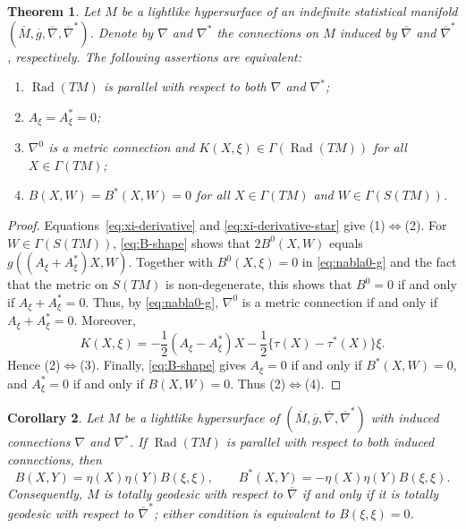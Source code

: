 \documentclass[10pt,a4paper]{amsart}
\newtheorem{theorem}{Theorem}[section]
\newtheorem{corollary}[theorem]{Corollary}
\newcommand{\Rad}{\operatorname{Rad}}
\begin{document}
\begin{theorem}\label{thm:radical-both}
Let $M$ be a lightlike hypersurface of an indefinite statistical manifold
$(\overline{M},\overline{g},\overline{\nabla},\overline{\nabla}^{*})$.
Denote by $\nabla$ and $\nabla^{*}$ the connections on $M$ induced by
$\overline{\nabla}$ and $\overline{\nabla}^{*}$, respectively. The following
assertions are equivalent:
\begin{enumerate}
\item $\Rad(TM)$ is parallel with respect to both $\nabla$ and
$\nabla^{*}$;
\item $A_{\xi}=A_{\xi}^{*}=0$;
\item $\nabla^{0}$ is a metric connection and
$K(X,\xi)\in\Gamma(\Rad(TM))$ for all $X\in\Gamma(TM)$;
\item $B(X,W)=B^{*}(X,W)=0$ for all $X\in\Gamma(TM)$ and
$W\in\Gamma(S(TM))$.
\end{enumerate}
\end{theorem}

\begin{proof}
Equations~\eqref{eq:xi-derivative} and
\eqref{eq:xi-derivative-star} give (1)$\Leftrightarrow$(2). For $W\in\Gamma(S(TM))$, \eqref{eq:B-shape} shows that
$2B^{0}(X,W)$ equals $g((A_{\xi}+A_{\xi}^{*})X,W)$. Together with
$B^{0}(X,\xi)=0$ in \eqref{eq:nabla0-g} and the fact that the metric on
$S(TM)$ is non-degenerate, this shows that $B^{0}=0$ if and only if
$A_{\xi}+A_{\xi}^{*}=0$. Thus, by \eqref{eq:nabla0-g},
$\nabla^{0}$ is a metric connection if and only if
$A_{\xi}+A_{\xi}^{*}=0$. Moreover,
\begin{equation}\label{eq:K-xi}
K(X,\xi)
=-\frac12(A_{\xi}-A_{\xi}^{*})X
-\frac12\{\tau(X)-\tau^{*}(X)\}\xi.
\end{equation}
Hence (2)$\Leftrightarrow$(3). Finally, \eqref{eq:B-shape} gives
$A_{\xi}=0$ if and only if $B^{*}(X,W)=0$, and
$A_{\xi}^{*}=0$ if and only if $B(X,W)=0$. Thus
(2)$\Leftrightarrow$(4).
\end{proof}

\begin{corollary}\label{cor:radical-totally-geodesic}
Let $M$ be a lightlike hypersurface of
$(\overline{M},\overline{g},\overline{\nabla},\overline{\nabla}^{*})$ with
induced connections $\nabla$ and $\nabla^{*}$. If $\Rad(TM)$ is parallel
with respect to both induced connections, then
\begin{equation}\label{eq:B-radical-form}
B(X,Y)=\eta(X)\eta(Y)B(\xi,\xi),
\qquad
B^{*}(X,Y)=-\eta(X)\eta(Y)B(\xi,\xi).
\end{equation}
Consequently, $M$ is totally geodesic with respect to
$\overline{\nabla}$ if and only if it is totally geodesic with respect
to $\overline{\nabla}^{*}$; either condition is equivalent to
$B(\xi,\xi)=0$.
\end{corollary}
\end{document}
